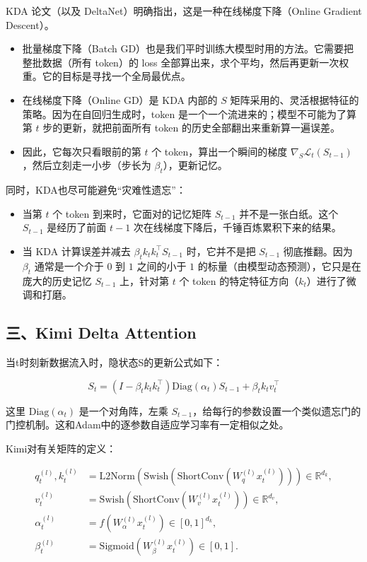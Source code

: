 KDA 论文（以及 DeltaNet）明确指出，这是一种在线梯度下降（Online Gradient Descent）。

\begin{itemize}
\tightlist
\item
  批量梯度下降（Batch GD）也是我们平时训练大模型时用的方法。它需要把整批数据（所有 token）的 loss 全部算出来，求个平均，然后再更新一次权重。它的目标是寻找一个全局最优点。
\item
  在线梯度下降（Online GD）是 KDA 内部的 \(S\) 矩阵采用的、灵活根据特征的策略。因为在自回归生成时，token 是一个一个流进来的；模型不可能为了算第 \(t\) 步的更新，就把前面所有 token 的历史全部翻出来重新算一遍误差。
\item
  因此，它每次只看眼前的第 \(t\) 个 token，算出一个瞬间的梯度 \(\nabla_S\mathcal{L}_t(S_{t-1})\)，然后立刻走一小步（步长为 \(\beta_t\)），更新记忆。
\end{itemize}

同时，KDA也尽可能避免``灾难性遗忘''：

\begin{itemize}
\tightlist
\item
  当第 \(t\) 个 token 到来时，它面对的记忆矩阵 \(S_{t-1}\) 并不是一张白纸。这个 \(S_{t-1}\) 是经历了前面 \(t-1\) 次在线梯度下降后，千锤百炼累积下来的结果。
\item
  当 KDA 计算误差并减去 \(\beta_t k_t k_t^\top S_{t-1}\) 时，它并不是把 \(S_{t-1}\) 彻底推翻。因为 \(\beta_t\) 通常是一个介于 \(0\) 到 \(1\) 之间的小于 \(1\) 的标量（由模型动态预测），它只是在庞大的历史记忆 \(S_{t-1}\) 上，针对第 \(t\) 个 token 的特定特征方向（\(k_t\)）进行了微调和打磨。
\end{itemize}

\hypertarget{ux4e09kimi-delta-attention}{%
\subsection{三、Kimi Delta Attention}\label{ux4e09kimi-delta-attention}}

当t时刻新数据流入时，隐状态S的更新公式如下：

\[
S_t=\left(I-\beta_t k_t k_t^\top\right)\mathrm{Diag}(\alpha_t)S_{t-1}+\beta_t k_t v_t^\top
\]

这里 \(\mathrm{Diag}(\alpha_t)\) 是一个对角阵，左乘 \(S_{t-1}\)，给每行的参数设置一个类似遗忘门的门控机制。这和Adam中的逐参数自适应学习率有一定相似之处。

Kimi对有关矩阵的定义：

\[
\begin{aligned}
q_t^{(l)},k_t^{(l)}
&=\mathrm{L2Norm}\left(\mathrm{Swish}\left(\mathrm{ShortConv}\left(W_q^{(l)}x_t^{(l)}\right)\right)\right)\in\mathbb{R}^{d_k},\\
v_t^{(l)}
&=\mathrm{Swish}\left(\mathrm{ShortConv}\left(W_v^{(l)}x_t^{(l)}\right)\right)\in\mathbb{R}^{d_v},\\
\alpha_t^{(l)}
&=f\left(W_\alpha^{(l)}x_t^{(l)}\right)\in[0,1]^{d_k},\\
\beta_t^{(l)}
&=\mathrm{Sigmoid}\left(W_\beta^{(l)}x_t^{(l)}\right)\in[0,1].
\end{aligned}
\]

